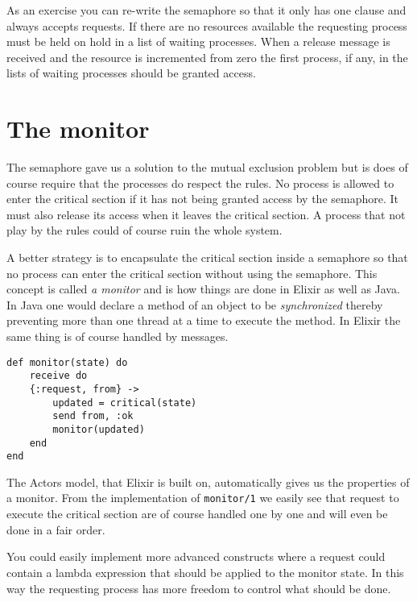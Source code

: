 \documentclass[a4paper,11pt]{article}
\begin{document}
As an exercise you can re-write the semaphore so that it only has one
clause and always accepts requests. If there are no resources
available the requesting process must be held on hold in a list of
waiting processes. When a release message is received and the resource
is incremented from zero the first process, if any, in the lists of
waiting processes should be granted access. 



\section{The monitor}

The semaphore gave us a solution to the mutual exclusion problem but
is does of course require that the processes do respect the rules. No
process is allowed to enter the critical section if it has not being
granted access by the semaphore. It must also release its access when
it leaves the critical section. A process that not play by the rules
could of course ruin the whole system.

A better strategy is to encapsulate the critical section inside a
semaphore so that no process can enter the critical section without
using the semaphore. This concept is called {\em a monitor} and is how
things are done in Elixir as well as Java. In Java one would declare a
method of an object to be {\em synchronized} thereby preventing more
than one thread at a time to execute the method. In Elixir the same
thing is of course handled by messages.

\begin{verbatim}
def monitor(state) do
    receive do
    {:request, from} ->
        updated = critical(state)
        send from, :ok
        monitor(updated)
    end
end
\end{verbatim}

The Actors model, that Elixir is built on, automatically gives us the
properties of a monitor. From the implementation of {\tt monitor/1}
we easily see that request to execute the critical section are of
course handled one by one and will even be done in a fair order.

You could easily implement more advanced constructs where a request
could contain a lambda expression that should be applied to the
monitor state. In this way the requesting process has more freedom to
control what should be done.
\end{document}
